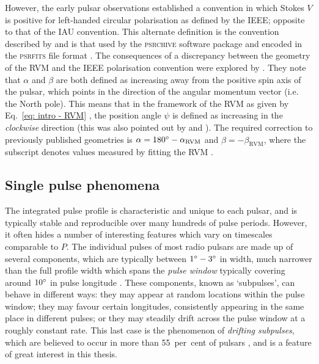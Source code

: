 However, the early pulsar observations \citep[e.g.][]{Mxxx1971} established a convention in which Stokes $V$ is positive for left-handed circular polarisation as defined by the IEEE; opposite to that of the IAU convention. This alternate definition is the convention described by \citet{Kxxx1966} and is that used by the \textsc{psrchive} software package and encoded in the \textsc{psrfits} file format \citep{SMJR2010}. The consequences of a discrepancy between the geometry of the RVM and the IEEE polarisation convention were explored by \citet{EWxx2001}. They note that $\alpha$ and $\beta$ are both defined as increasing away from the positive spin axis of the pulsar, which points in the direction of the angular momentum vector (i.e. the North pole). This means that in the framework of the RVM as given by Eq.~\eqref{eq: intro - RVM} \citep{Kxxx1970}, the position angle $\psi$ is defined as increasing in the \textit{clockwise} direction (this was also pointed out by \citealt{DTxx1992} and \citealt{APTW1996}). The required correction to previously published geometries is $\alpha = 180^\circ - \alpha_\mathrm{RVM}$ and $\beta = -\beta_\mathrm{RVM}$, where the subscript denotes values measured by fitting the RVM \citep{EWxx2001}. 


\subsection{Single pulse phenomena}
\label{sec: intro - emission models - single pulse phenomena}

The integrated pulse profile is characteristic and unique to each pulsar, and is typically stable and reproducible over many hundreds of pulse periods. However, it often hides a number of interesting features which vary on timescales comparable to $P$. The individual pulses of most radio pulsars are made up of several components, which are typically between $1^\circ-3^\circ$ in width, much narrower than the full profile width which spans the \textit{pulse window} typically covering around $10^\circ$ in pulse longitude \citep[e.g.][]{KWJ+1994}. These components, known as `subpulses', can behave in different ways: they may appear at random locations within the pulse window; they may favour certain longitudes, consistently appearing in the same place in different pulses; or they may steadily drift across the pulse window at a roughly constant rate. This last case is the phenomenon of \textit{drifting subpulses}, which are believed to occur in more than 55~per~cent of pulsars \citep{WESx2007}, and is a feature of great interest in this thesis.

